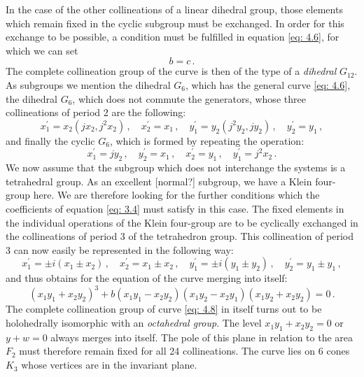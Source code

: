 \documentclass[leqno]{article}
\begin{document}
In the case of the other collineations of a linear dihedral group, those elements which remain fixed in the cyclic subgroup must be exchanged. In order for this exchange to be possible, a condition must be fulfilled in equation \eqref{eq: 4.6}, for which we can set 
\begin{equation}\label{eq: 4.7}
b=c \, . \tag{7}
\end{equation}
The complete collineation group of the curve is then of the type of a \textit{dihedral} $G_{12}$. As subgroups we mention the dihedral $G_6$, which has the general curve \eqref{eq: 4.6}, the dihedral $G_6$, which does not commute the generators, whose three collineations of period 2 are the following: 
\[
x_1^\prime = x_2( jx_2, j^2 x_2) \, , \quad x_2^\prime = x_1 \, , \quad y_1^\prime = y_2(j^2 y_2, j y_2) \, , \quad y_2^\prime = y_1 \, , 
\] 
and finally the cyclic $G_6$, which is formed by repeating the operation: 
\[
x_1^\prime = j y_2 \, , \quad y_2^\prime = x_1 \, , \quad x_2^\prime = y_1 \, , \quad y_1^\prime = j^2 x_2 \, . 
\]
We now assume that the subgroup which does not interchange the systems is a tetrahedral group. As an excellent [normal?] subgroup, we have a Klein four-group here. We are therefore looking for the further conditions which the coefficients of equation \eqref{eq: 3.4} must satisfy in this case. The fixed elements in the individual operations of the Klein four-group are to be cyclically exchanged in the collineations of period 3 of the tetrahedron group. This collineation of period 3 can now easily be represented in the following way:
\[
x_1^\prime = \pm i(x_1 \pm x_2) \, , \quad x_2^\prime = x_1 \pm x_2 \, , \quad y_1^\prime = \pm i (y_1 \pm y_2) \, , \quad y_2^\prime = y_1 \pm y_1 \, , 
\]
and thus obtains for the equation of the curve merging into itself:
\begin{equation}\label{eq: 4.8}
(x_1 y_1 + x_2 y_2)^3 + b(x_1 y_1 - x_2 y_2) (x_1 y_2 - x_2 y_1)( x_1 y_2 + x_2 y_2) = 0 \, . \tag{8}
\end{equation}
The complete collineation group of curve \eqref{eq: 4.8} in itself turns out to be holohedrally isomorphic with an \textit{octahedral group}. The level $x_1 y_1 + x_2 y_2 = 0$ or $y+w=0$ always merges into itself. The pole of this plane in relation to the area $F_2$ must therefore remain fixed for all 24 collineations. The curve lies on 6 cones $K_3$ whose vertices are in the invariant plane.
\end{document}
